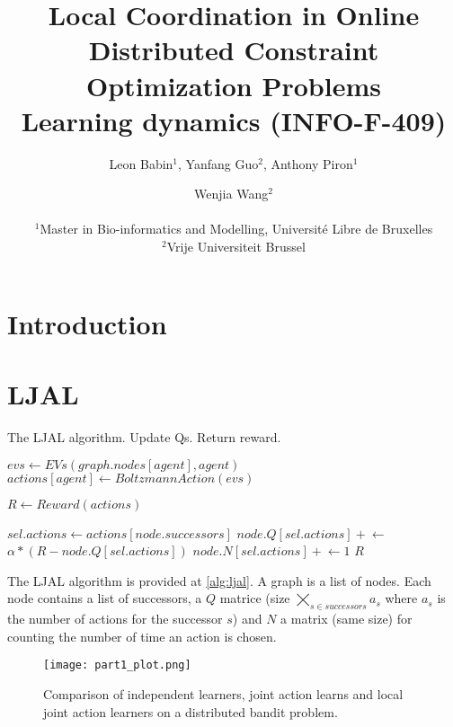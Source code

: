 \documentclass[a4paper, 12pt]{article}
\title{Local Coordination in Online Distributed Constraint Optimization Problems \citep{Brys2012} \\ \large Learning dynamics (INFO-F-409)}
\author{Leon Babin$^1$, Yanfang Guo$^2$, Anthony Piron$^1$ \and Wenjia Wang$^2$ \\
\mbox{}\\
$^1$Master in Bio-informatics and Modelling, Université Libre de Bruxelles \\
$^2$Vrije Universiteit Brussel}
\begin{document}
\maketitle

\begin{abstract}
  
\end{abstract}

\section{Introduction}


\section{LJAL}

\begin{algorithm}[tph]
  \caption{The LJAL algorithm. Update Qs. Return reward.}
  \label{alg:ljal}
  \begin{algorithmic}[1]
    \State $evs\gets EVs(graph.nodes[agent], agent)$
    \State $actions[agent]\gets BoltzmannAction(evs)$
    \EndFor

    \State $R\gets Reward(actions)$

    \State $sel.actions\gets actions[node.successors]$
    \State $node.Q[sel.actions] \mathrel{+}\gets$
    \State \hspace{1cm}$\alpha * (R - node.Q[sel.actions])$
    \State $node.N[sel.actions]\mathrel{+}\gets 1$
    \EndFor
    \Return $R$
    \EndFunction
    \State
    \State {}
    \EndFor
  \end{algorithmic}
\end{algorithm}

The LJAL algorithm is provided at \ref{alg:ljal}. A graph is a list of nodes. Each node contains a list of successors, a $Q$ matrice (size $\bigtimes_{s \in successors} a_s$ where $a_s$ is the number of actions for the successor $s$) and $N$ a matrix (same size) for counting the number of time an action is chosen. 

\begin{figure*}[tp]
  \centering
  \texttt{[image: part1\_plot.png]}
  \caption{Comparison of independent learners, joint action learns and local joint action learners on a distributed bandit problem.}
  \label{fig:part1}
\end{figure*}
\end{document}
